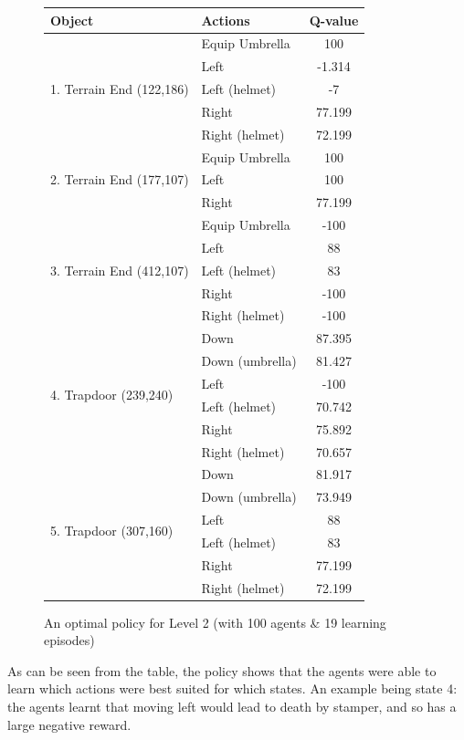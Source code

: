 \documentclass[a4paper,oneside]{report}
\begin{document}
\begin{figure}[H]
\centering    
\begin{tabular}{|l|l|c|}
\hline
Object & Actions & Q-value \\ \hline

\multirow{5}{*}{1. Terrain End (122,186)} & Equip Umbrella & 100 \\
 & Left & -1.314 \\
 & Left (helmet) & -7 \\
 & Right & 77.199 \\ 
 & Right (helmet) & 72.199 \\ \hline
 
\multirow{3}{*}{2. Terrain End (177,107)} & Equip Umbrella & 100 \\
 & Left & 100 \\
 & Right & 77.199 \\ \hline
 
\multirow{5}{*}{3. Terrain End (412,107)} & Equip Umbrella & -100 \\
 & Left & 88 \\
 & Left (helmet) & 83 \\
 & Right & -100 \\
 & Right (helmet) & -100 \\ \hline

\multirow{6}{*}{4. Trapdoor (239,240)} & Down & 87.395 \\
 & Down (umbrella) & 81.427 \\
 & Left & -100 \\
 & Left (helmet) & 70.742 \\
 & Right & 75.892 \\
 & Right (helmet) & 70.657 \\ \hline

\multirow{6}{*}{5. Trapdoor (307,160)} & Down & 81.917 \\
 & Down (umbrella) & 73.949 \\
 & Left & 88 \\
 & Left (helmet) & 83 \\
 & Right & 77.199 \\
 & Right (helmet) & 72.199 \\ \hline
 
\end{tabular}

\caption{An optimal policy for Level 2 (with 100 agents \& 19 learning episodes)}
\end{figure}

As can be seen from the table, the policy shows that the agents were able to learn which actions were best suited for which states. An example being state 4: the agents learnt that moving left would lead to death by stamper, and so has a large negative reward.
\end{document}
